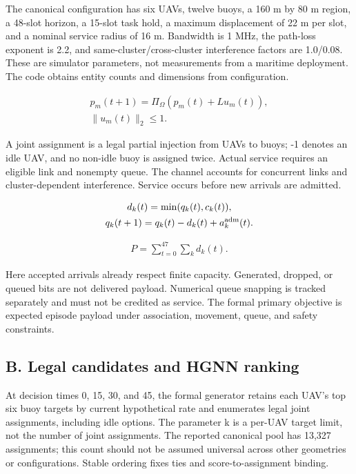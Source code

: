 The canonical configuration has six UAVs, twelve buoys, a 160 m by 80 m region, a 48-slot horizon, a 15-slot task hold, a maximum displacement of 22 m per slot, and a nominal service radius of 16 m. Bandwidth is 1 MHz, the path-loss exponent is 2.2, and same-cluster/cross-cluster interference factors are 1.0/0.08. These are simulator parameters, not measurements from a maritime deployment. The code obtains entity counts and dimensions from configuration.

\begin{equation*}
\begin{gathered}
p_m(t+1)=\Pi_\Omega\!\left(p_m(t)+L u_m(t)\right),\\ \|u_m(t)\|_2\le1.
\end{gathered}
\end{equation*}

A joint assignment is a legal partial injection from UAVs to buoys; -1 denotes an idle UAV, and no non-idle buoy is assigned twice. Actual service requires an eligible link and nonempty queue. The channel accounts for concurrent links and cluster-dependent interference. Service occurs before new arrivals are admitted.

\begin{equation*}
\begin{gathered}
d_k(t)=\min(q_k(t),c_k(t)),\\ q_k(t+1)=q_k(t)-d_k(t)+a_k^{\rm adm}(t).
\end{gathered}
\end{equation*}

\begin{equation*}
\begin{gathered}
P=\sum_{t=0}^{47}\sum_k d_k(t).
\end{gathered}
\end{equation*}

Here accepted arrivals already respect finite capacity. Generated, dropped, or queued bits are not delivered payload. Numerical queue snapping is tracked separately and must not be credited as service. The formal primary objective is expected episode payload under association, movement, queue, and safety constraints.

\subsection*{B. Legal candidates and HGNN ranking}

At decision times 0, 15, 30, and 45, the formal generator retains each UAV's top six buoy targets by current hypothetical rate and enumerates legal joint assignments, including idle options. The parameter k is a per-UAV target limit, not the number of joint assignments. The reported canonical pool has 13,327 assignments; this count should not be assumed universal across other geometries or configurations. Stable ordering fixes ties and score-to-assignment binding.

